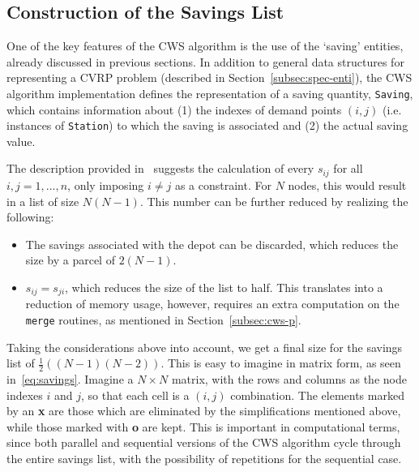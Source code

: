 \subsection{Construction of the Savings List}
\label{subsec:savings}

One of the key features of the CWS algorithm is the use of the `saving' 
entities, already discussed in previous sections. In addition to general data 
structures for representing a CVRP problem (described in 
Section~\ref{subsec:spec-enti}), the 
CWS algorithm implementation defines the representation of a saving quantity, 
\verb?Saving?, which contains information about (1) the indexes of demand 
points $(i,j)$ (i.e. instances of \verb?Station?) to which the saving is 
associated and (2) the actual saving value.\vertbreak

The description provided 
in~\cite{Toth2002} suggests the calculation of every $s_{ij}$ for all 
$i, j = 1, ..., n$, only imposing $i \neq j$ as a constraint. For $N$ nodes, 
this would result in a list of size $N(N - 1)$. This number can be further 
reduced by realizing the following:

\begin{itemize}

    \item The savings associated with the depot can be discarded, which 
            reduces the size by a parcel of $2(N - 1)$.
    \item $s_{ij} = s_{ji}$, which reduces the size of the list to half. This 
            translates into a reduction of memory usage, however, requires an 
            extra computation on the \verb?merge? routines, as mentioned in 
            Section~\ref{subsec:cws-p}.

\end{itemize}\vertbreak

Taking the considerations above into account, we get a final size for the 
savings list of $\frac{1}{2}((N - 1)(N - 2))$. This is easy to imagine in 
matrix form, as seen in~\ref{eq:savings}. Imagine a $N \times N$ matrix, with 
the rows and columns as the node indexes $i$ and $j$, so that each cell is a 
$(i,j)$ combination. The elements marked by an \textbf{x} are those which are 
eliminated by the simplifications mentioned above, while those marked with 
\textbf{o} are kept. This is important in computational terms, since both 
parallel and sequential versions of the CWS algorithm cycle through the entire 
savings list, with the possibility of repetitions for the sequential 
case.\vertbreak

